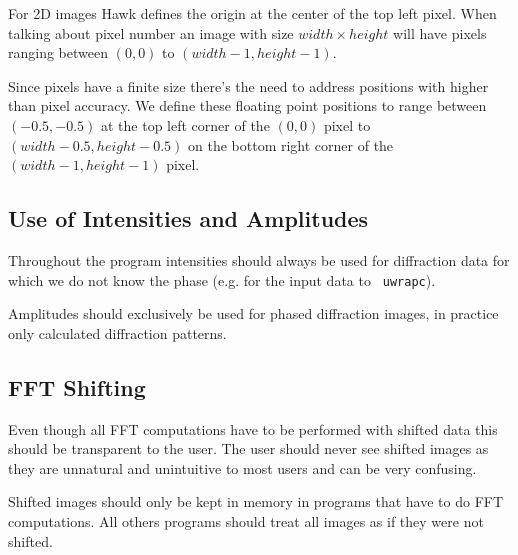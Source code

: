 \documentclass[12pt]{article}
\begin{document}
For 2D images Hawk defines the origin at the center of the top left pixel.
When talking about pixel number an image with size $width \times height$ will have
pixels ranging between $(0,0)$ to $(width-1,height-1)$. 

Since pixels have a finite size there's the need to address positions with
higher than pixel accuracy. We define these floating point positions to range
between $(-0.5,-0.5)$ at the top left corner of the $(0,0)$ pixel to
$(width-0.5,height-0.5)$ on the bottom right corner of the $(width-1,height-1)$
pixel.


\subsection{Use of Intensities and Amplitudes}
Throughout the program intensities should always be used for diffraction data
for which we do not know the phase (e.g. for the input data to {\tt
  uwrapc}). 

Amplitudes should exclusively be used for phased diffraction images,
in practice only calculated diffraction patterns.

\subsection{FFT Shifting}
Even though all FFT computations have to be performed with shifted data this
should be transparent to the user. The user should never see shifted images as
they are unnatural and unintuitive to most users and can be very confusing.

Shifted images should only be kept in memory in programs that have to do FFT
computations. All others programs should treat all images as if they were not shifted.
\end{document}
